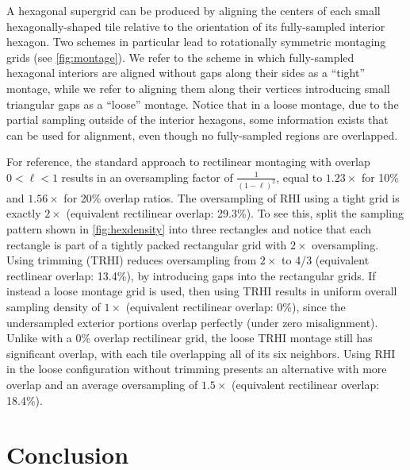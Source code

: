 \documentclass[aip, amsmath, amssymb, nobibnotes, nofootinbib, citeautoscript, reprint, superscriptaddress]{revtex4-1}
\begin{document}
    A hexagonal supergrid can be produced by aligning the centers of each small hexagonally-shaped tile relative to the orientation of its fully-sampled interior hexagon.
    Two schemes in particular lead to rotationally symmetric montaging grids (see \autoref{fig:montage}).
    We refer to the scheme in which fully-sampled hexagonal interiors are aligned without gaps along their sides as a ``tight'' montage, while we refer to aligning them along their vertices introducing small triangular gaps as a ``loose'' montage.
    Notice that in a loose montage, due to the partial sampling outside of the interior hexagons, some information exists that can be used for alignment, even though no fully-sampled regions are overlapped.


    For reference, the standard approach to rectilinear montaging with overlap $\mathrm{0<\ell<1}$ results in an oversampling factor of $\mathrm{\frac{1}{(1-\ell)^2}}$, equal to $\mathrm{1.23\times}$ for 10\% and $\mathrm{1.56\times}$ for 20\% overlap ratios.
    The oversampling of RHI using a tight grid is exactly $2\times$ (equivalent rectilinear overlap: 29.3\%).
    To see this, split the sampling pattern shown in \autoref{fig:hexdensity} into three rectangles and notice that each rectangle is part of a tightly packed rectangular grid with $\mathrm{2\times}$ oversampling.
    Using trimming (TRHI) reduces oversampling from $2\times$ to 4/3 (equivalent rectlinear overlap: 13.4\%), by introducing gaps into the rectangular grids.
    If instead a loose montage grid is used, then using TRHI results in uniform overall sampling density of $1\times$ (equivalent rectilinear overlap: 0\%), since the undersampled exterior portions overlap perfectly (under zero misalignment).
    Unlike with a 0\% overlap rectilinear grid, the loose TRHI montage still has significant overlap, with each tile overlapping all of its six neighbors.
    Using RHI in the loose configuration without trimming presents an alternative with more overlap and an average oversampling of $\mathrm{1.5\times}$ (equivalent rectilinear overlap: 18.4\%).

    \section{\label{sec:conclusion}Conclusion}
\end{document}
